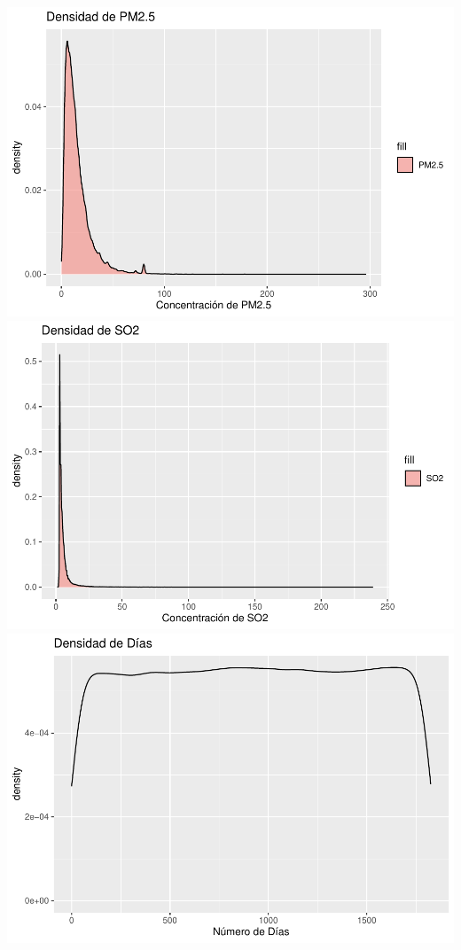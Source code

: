 \documentclass[notspecified,article,submit,moreauthors,pdftex]{Definitions/mdpi}
\begin{document}
\includegraphics{ProyectoAED2023_files/figure-latex/unnamed-chunk-21-4.pdf}
\includegraphics{ProyectoAED2023_files/figure-latex/unnamed-chunk-21-5.pdf}
\includegraphics{ProyectoAED2023_files/figure-latex/unnamed-chunk-21-6.pdf}
\end{document}
